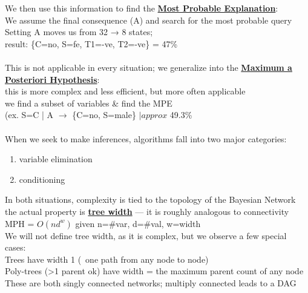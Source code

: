 \documentclass[../../lecture_notes.tex]{subfiles}
\begin{document}
\begin{center}\end{center}

\noindent We then use this information to find the \textbf{\underline{Most Probable Explanation}}:\\
We assume the final consequence (A) and search for the most probable query\\
	\indent Setting A moves us from 32 → 8 states;\\
	\indent result: \{C=no, S=fe, T1=-ve, T2=-ve\} = 47\%\\
\\
This is not applicable in every situation; we generalize into the \textbf{\underline{Maximum a Posteriori Hypothesis}}:\\
	\indent this is more complex and less efficient, but more often applicable\\
	\indent we find a subset of variables \& find the MPE\\
	\indent (ex. S=C | A $\rightarrow$ \{C=no, S=male\} $|approx$ 49.3\%\\
\\
When we seek to make inferences, algorithms fall into two major categories:
\begin{enumerate} [itemsep=0mm]
	\item variable elimination
	\item conditioning
\end{enumerate} \medskip

\noindent In both situations, complexity is tied to the topology of the Bayesian Network\\
	\indent the actual property is \textbf{\underline{tree width}} — it is roughly analogous to connectivity\\
	\indent MPH = $O(nd^w)$ given n=\#var, d=\#val, w=width\\
We will not define tree width, as it is complex, but we observe a few special cases:\\
	\indent Trees have width 1 (~one path from any node to node)\\
	\indent Poly-trees (>1 parent ok) have width = the maximum parent count of any node\\
These are both singly connected networks; multiply connected leads to a DAG\\
\end{document}
